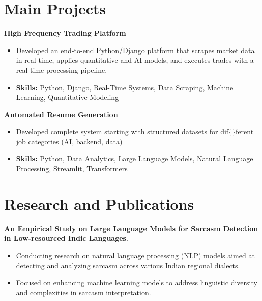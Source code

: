 \documentclass[a4paper,11pt]{article}
\begin{document}
\section{\textbf{Main Projects}}

\vspace{1mm}
  \textbf{High Frequency Trading Platform  }
\vspace{-1.5mm} %
\begin{itemize}
  \item Developed an end-to-end Python/Django platform that scrapes market data in real time, applies quantitative and AI models, and executes trades with a real-time processing pipeline.
\vspace{-3mm}
  \item \textbf{Skills:} Python, Django, Real-Time Systems, Data Scraping, Machine Learning, Quantitative Modeling
\end{itemize}


\vspace{1mm}
   \textbf{Automated Resume Generation }
\vspace{-1.5mm} %
\begin{itemize}
  \item Developed complete system starting with structured datasets for dif\{\}ferent job categories (AI, backend, data)
\vspace{-3mm}
  \item \textbf{Skills:} Python, Data Analytics, Large Language Models, Natural Language Processing, Streamlit, Transformers
\end{itemize}



\section{\textbf{Research and Publications} \hfill }
\vspace{1mm}
  \textbf{An Empirical Study on Large Language Models for Sarcasm Detection in Low-resourced Indic Languages}.
\vspace{-1mm} %
\begin{itemize}
  \item Conducting research on natural language processing (NLP) models aimed at detecting and analyzing sarcasm across various Indian regional dialects.
\vspace{-3mm}
  \item Focused on enhancing machine learning models to address linguistic diversity and complexities in sarcasm interpretation.
\end{itemize}
\end{document}
